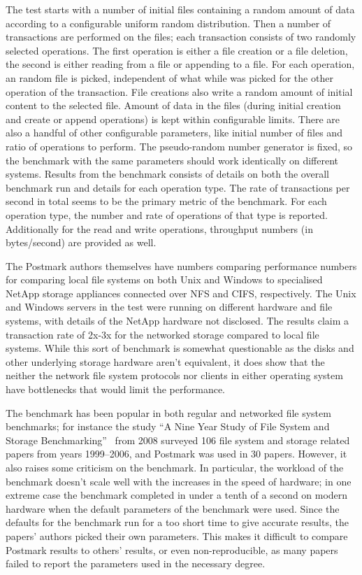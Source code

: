 The test starts with a number of initial files containing a random amount of data according to a configurable uniform random distribution.
Then a number of transactions are performed on the files; each transaction consists of two randomly selected operations.
The first operation is either a file creation or a file deletion, the second is either reading from a file or appending to a file.
For each operation, an random file is picked, independent of what while was picked for the other operation of the transaction.
File creations also write a random amount of initial content to the selected file.
Amount of data in the files (during initial creation and create or append operations) is kept within configurable limits.
There are also a handful of other configurable parameters, like initial number of files and ratio of operations to perform.
The pseudo-random number generator is fixed, so the benchmark with the same parameters should work identically on different systems.
Results from the benchmark consists of details on both the overall benchmark run and details for each operation type.
The rate of transactions per second in total seems to be the primary metric of the benchmark.
For each operation type, the number and rate of operations of that type is reported.
Additionally for the read and write operations, throughput numbers (in bytes/second) are provided as well.

The Postmark authors themselves have numbers comparing performance numbers for comparing local file systems on both Unix and Windows
to specialised NetApp storage appliances connected over NFS and CIFS, respectively.
The Unix and Windows servers in the test were running on different hardware and file systems,
with details of the NetApp hardware not disclosed.
The results claim a transaction rate of 2x-3x for the networked storage compared to local file systems.
While this sort of benchmark is somewhat questionable as the disks and other underlying storage hardware aren't equivalent,
it does show that the neither the network file system protocols nor clients in either operating system have
bottlenecks that would limit the performance.

The benchmark has been popular in both regular and networked file system benchmarks;
for instance the study ``A Nine Year Study of File System and Storage Benchmarking''~\cite{MetaStudy} from 2008
surveyed 106 file system and storage related papers from years 1999--2006, and Postmark was used in 30 papers.
However, it also raises some criticism on the benchmark.
In particular, the workload of the benchmark doesn't scale well with the increases in the speed of hardware;
in one extreme case the benchmark completed in under a tenth of a second on modern hardware when the default parameters
of the benchmark were used.
Since the defaults for the benchmark run for a too short time to give accurate results,
the papers' authors picked their own parameters.
This makes it difficult to compare Postmark results to others' results,
or even non-reproducible, as many papers failed to report the parameters used in the necessary degree.

